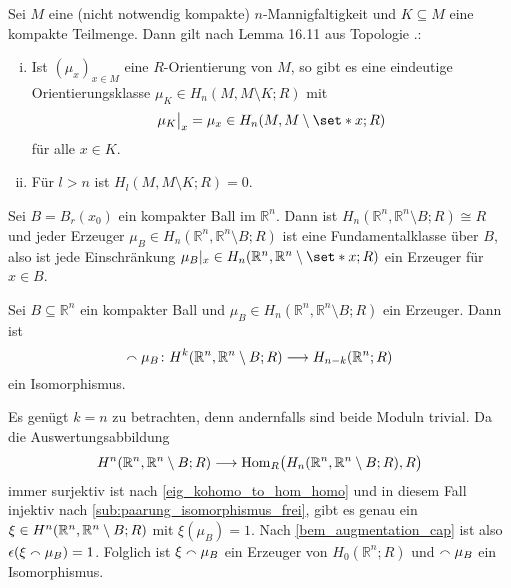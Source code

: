 \begin{erinnerungA}[{name=[Orientierungsklassen für kompakte Teilmengen]},label=errinnerung:Orientierung_kompakteTM]
	Sei $M$ eine (nicht notwendig kompakte) $n$-Mannigfaltigkeit und $K \subseteq M$ eine kompakte Teilmenge. Dann gilt nach Lemma 16.11 aus Topologie .:
	\begin{enumerate}[(i),itemsep=0pt]
		\item Ist $(\mu_x)_{x \in M}$ eine $R$-Orientierung von $M$, so gibt es eine eindeutige Orientierungsklasse $\mu_K \in H_n(M,M \setminus K;R)$ mit 
		\[
			\mu_K\big|_x = \mu_x \in H_n(M,M \setminus \set*{x};R)
		\]
		für alle $x \in K$.
		\item Für $l>n$ ist $H_l(M, M \setminus K;R)=0$.
	\end{enumerate}
\end{erinnerungA}

\begin{beispiel}[{name=[Fundamentalklasse eines kompakten Balls]}]
	Sei $B=B_r(x_0)$ ein kompakter Ball im $\mathbb{R}^n$. 
	Dann ist $H_n(\mathbb{R}^n,\mathbb{R}^n \setminus B;R) \cong R$ und jeder Erzeuger $\mu_B \in H_n(\mathbb{R}^n,\mathbb{R}^n \setminus B;R)$ ist eine Fundamentalklasse über $B$, also ist jede Einschränkung $\mu_B|_x \in H_n(\mathbb{R}^n,\mathbb{R}^n \setminus \set*{x};R)$ ein Erzeuger für $x \in B$.
\end{beispiel}

\begin{lemma}[{name=[Isomorphismus von Kohomologie und Homologie für kompakte Bälle]},label=Rn_kompakteBaelle]
	Sei $B \subseteq \mathbb{R}^n$ ein kompakter Ball und $\mu_B \in H_n(\mathbb{R}^n,\mathbb{R}^n \setminus B;R)$ ein Erzeuger. Dann ist 
	\[
		\capp \mu_B \colon H^k \enbrace*{\mathbb{R}^n,\mathbb{R}^n \setminus B;R} \longrightarrow H_{n-k}(\mathbb{R}^n;R)
	\]
	ein Isomorphismus.
\end{lemma}
\begin{beweis}
	Es genügt $k=n$ zu betrachten, denn andernfalls sind beide Moduln trivial. Da die Auswertungsabbildung 
	\[
		H^n(\mathbb{R}^n,\mathbb{R}^n \setminus B;R) \longrightarrow \Hom_R \enbrace[\big]{H_n(\mathbb{R}^n,\mathbb{R}^n \setminus B;R),R}
	\]
	immer surjektiv ist nach \autoref{eig_kohomo_to_hom_homo} und in diesem Fall injektiv nach \cref{sub:paarung_isomorphismus_frei}, gibt es genau ein $\xi \in H^n \enbrace*{\mathbb{R}^n,\mathbb{R}^n \setminus B;R}$ mit $\xi(\mu_B)=1$. 
	Nach \autoref{bem_augmentation_cap} ist also $\epsilon(\xi \capp \mu_B)=1$. 
	Folglich ist $\xi \capp \mu_B$ ein Erzeuger von $H_0(\mathbb{R}^n;R)$ und $\capp \mu_B$ ein Isomorphismus.
\end{beweis}

